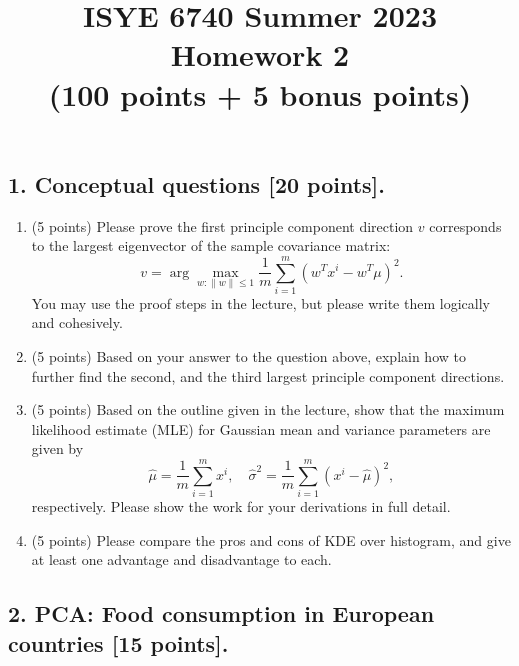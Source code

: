 \documentclass[twoside,10pt]{article}
\begin{document}
\title{ISYE 6740 Summer 2023\\ Homework 2 \\
(100 points + 5 bonus points)}
\date{}

\maketitle

\subsection*{1. Conceptual questions [20 points].}


\begin{enumerate}

\item (5 points) Please prove the first principle component direction $v$ corresponds to the largest eigenvector of the sample covariance matrix:
\[
v = \arg\max_{w: \|w\|\leq 1} \frac 1 m \sum_{i=1}^m (w^T x^i - w^T \mu)^2.
\]
You may use the proof steps in the lecture, but please write them logically and cohesively.

\item (5 points) Based on your answer to the question above, explain how to further find the second, and the third largest principle component directions.

\item (5 points) Based on the outline given in the lecture, show that the maximum likelihood estimate (MLE) for Gaussian mean and variance parameters are given by 
\[
\hat \mu = \frac 1 m \sum_{i=1}^m x^i, \quad \hat \sigma^2 = \frac 1 m \sum_{i=1}^m (x^i - \hat \mu)^2,
\]
respectively. Please show the work for your derivations in full detail.



\item (5 points) Please compare the pros and cons of KDE over histogram, and give at least one advantage and disadvantage to each.

\end{enumerate}


\clearpage

\subsection*{2. PCA: Food consumption in European countries [15 points].}
\end{document}
